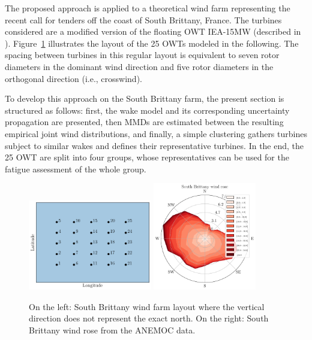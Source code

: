The proposed approach is applied to a theoretical wind farm representing the recent call for tenders off the coast of South Brittany, France. 
The turbines considered are a modified version of the floating OWT IEA-15MW (described in \citealp{kim_natarajan_2022}). 
Figure~\ref{fig:SB-farm} illustrates the layout of the 25 OWTs modeled in the following.%
The spacing between turbines in this regular layout is equivalent to seven rotor diameters in the dominant wind direction and five rotor diameters in the orthogonal direction (i.e., crosswind). 

To develop this approach on the South Brittany farm, the present section is structured as follows: 
first, the wake model and its corresponding uncertainty propagation are presented, 
then MMDs are estimated between the resulting empirical joint wind distributions, 
and finally, a simple clustering gathers turbines subject to similar wakes and defines their representative turbines. 
In the end, the 25 OWT are split into four groups, whose representatives can be used for the fatigue assessment of the whole group. 

\begin{figure}
    \centering
    \includegraphics[width=0.48\textwidth]{part2/figures/WAKE/layout_SB.png}
    \includegraphics[width=0.4\textwidth]{../numerical_experiments/chapter3/figures/SB_wind_rose.png}
    \caption{On the left: South Brittany wind farm layout where the vertical direction does not represent the exact north. On the right: South Brittany wind rose from the ANEMOC data.}
    \label{fig:SB-farm}
\end{figure}


